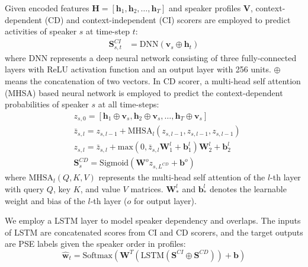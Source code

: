 \documentclass{article}
\begin{document}
Given encoded features $\mathbf{H}=[\mathbf{h}_1,\mathbf{h}_2,\dots,\mathbf{h}_T]$ and speaker profiles $\mathbf{V}$, context-dependent (CD) and context-independent (CI) scorers are employed to predict activities of speaker $s$ at time-step $t$:
\begin{equation}
\begin{split}
	\mathbf{S}^{CI}_{s,t}&=\text{DNN}\left(\mathbf{v}_s\oplus\mathbf{h}_t\right)
\end{split}
\end{equation}
where DNN represents a deep neural network consisting of three fully-connected layers with ReLU activation function and an output layer with 256 units. $\oplus$ means the concatenation of two vectors.
In CD scorer, a multi-head self attention (MHSA) based neural network is employed to predict the context-dependent probabilities of speaker $s$ at all time-steps:
\begin{equation}
\begin{split}
	&z_{s,0} = [\mathbf{h}_1\oplus\mathbf{{v}}_s, \mathbf{h}_2\oplus\mathbf{{v}}_s,\dots,\mathbf{h}_T\oplus\mathbf{{v}}_s] \\
	&\bar{z}_{s,l} = z_{s,l-1} + \text{MHSA}_l(z_{s,l-1}, z_{s,l-1}, z_{s,l-1}) \\
	&z_{s,l} = \bar{z}_{s,l} + \text{max}(0, \bar{z}_{s,l}\mathbf{W}^l_1+\mathbf{b}^l_1)\mathbf{W}^l_2+\mathbf{b}^l_2 \\
	&\mathbf{S}^{CD}_{s} = \text{Sigmoid}(\mathbf{W}^o z_{s,L^{CD}} + \mathbf{b}^{o}) 
\end{split} 
\end{equation}
where $\text{MHSA}_l(Q,K,V)$ represents the multi-head self attention of the $l$-th layer \cite{self_attention_1} with query $Q$, key $K$, and value $V$ matrices.
$\mathbf{W}^l_*$ and $\mathbf{b}^l_*$ denotes the learnable weight and bias of the $l$-th layer ($o$ for output layer). 

We employ a LSTM layer to model speaker dependency and overlaps.
The inputs of LSTM are concatenated scores from CI and CD scorers, and the target outputs are PSE labels given the speaker order in profiles:
\begin{equation}
    \hat{\mathbf{w}}_t=\text{Softmax}(\mathbf{W}^{T} ( \text{LSTM}(\mathbf{S}^{CI}\oplus\mathbf{S}^{CD})) + \mathbf{b})
\end{equation}
\end{document}
